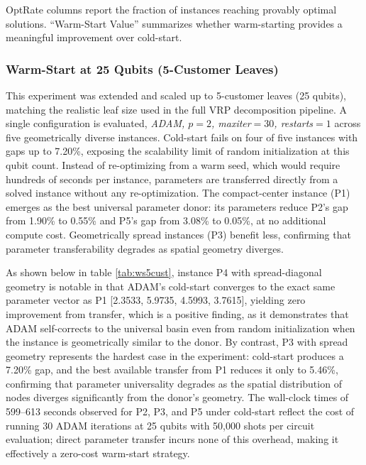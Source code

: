 \documentclass[a4paper]{report}
\begin{document}
{\begin{itemize}
\begin{itemize}
OptRate columns report the fraction of instances reaching provably optimal solutions. ``Warm-Start Value'' summarizes whether warm-starting provides a meaningful improvement over cold-start.

\subsubsection{Warm-Start at 25 Qubits (5-Customer Leaves)}

This experiment was extended and scaled up to 5-customer leaves (25 qubits), matching the realistic leaf size used in the full VRP decomposition pipeline. A single configuration is evaluated, \textit{ADAM, $p{=}2$, maxiter$=30$, restarts$=1$} across five geometrically diverse instances. Cold-start fails on four of five instances with gaps up to 7.20\%, exposing the scalability limit of random initialization at this qubit count. Instead of re-optimizing from a warm seed, which would require hundreds of seconds per instance, parameters are transferred directly from a solved instance without any re-optimization. The compact-center instance (P1) emerges as the best universal parameter donor: its parameters reduce P2's gap from 1.90\% to 0.55\% and P5's gap from 3.08\% to 0.05\%, at no additional compute cost. Geometrically spread instances (P3) benefit less, confirming that parameter transferability degrades as spatial
geometry diverges.

As shown below in table \ref{tab:ws5cust}, instance P4 with spread-diagonal geometry is notable in that ADAM's cold-start converges to the exact same parameter vector as P1 [2.3533, 5.9735, 4.5993, 3.7615], yielding zero improvement from transfer, which is a positive finding, as it demonstrates that ADAM self-corrects to the universal basin even from random initialization when the instance is geometrically similar to the donor. By contrast, P3  with spread geometry represents the hardest case in the experiment: cold-start produces a 7.20\% gap, and the best available transfer from P1 reduces it only to 5.46\%, confirming that parameter universality degrades as the spatial distribution of nodes diverges significantly from the donor's geometry. The wall-clock times of 599–613 seconds observed for P2, P3, and P5 under cold-start reflect the cost of running 30 ADAM iterations at 25 qubits with 50,000 shots per circuit evaluation; direct parameter transfer incurs none of this overhead, making it effectively a zero-cost warm-start strategy. \newline


\end{itemize}
\end{itemize}}
\end{document}
